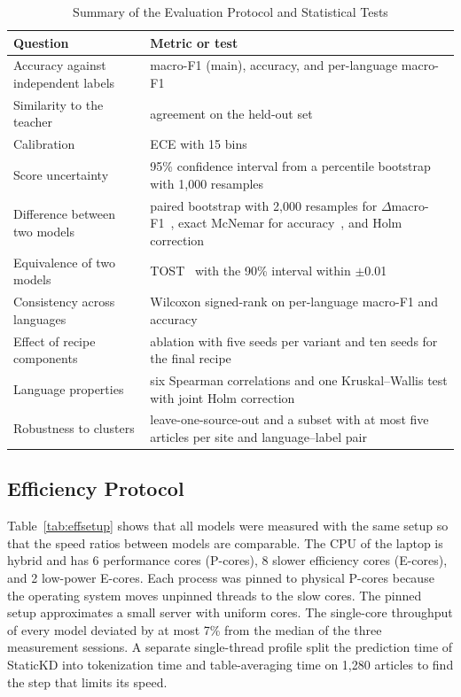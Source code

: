 \documentclass{ieeeaccess}
\begin{document}
\begin{table}[!t]
\caption{Summary of the Evaluation Protocol and Statistical Tests}
\label{tab:protocol}
\centering
\footnotesize
\setlength{\tabcolsep}{3pt}
\begin{tabular}{@{}p{}p{}@{}}
\toprule
Question & Metric or test \\
\midrule
Accuracy against independent labels & macro-F1 (main), accuracy, and per-language macro-F1 \\
Similarity to the teacher & agreement on the held-out set \\
Calibration & ECE with 15 bins \\
Score uncertainty & 95\% confidence interval from a percentile bootstrap with 1,000 resamples \\
Difference between two models & paired bootstrap with 2,000 resamples for $\Delta$macro-F1~\cite{koehn2004significance}, exact McNemar for accuracy~\cite{mcnemar1947}, and Holm correction~\cite{holm1979} \\
Equivalence of two models & TOST~\cite{schuirmann1987tost} with the 90\% interval within $\pm$0.01 \\
Consistency across languages & Wilcoxon signed-rank on per-language macro-F1 and accuracy~\cite{dror2018hitchhiker} \\
Effect of recipe components & ablation with five seeds per variant and ten seeds for the final recipe \\
Language properties & six Spearman correlations and one Kruskal--Wallis test with joint Holm correction \\
Robustness to clusters & leave-one-source-out and a subset with at most five articles per site and language--label pair \\
\bottomrule
\end{tabular}
\end{table}

\subsection{Efficiency Protocol}
\label{sec:effprotocol}
Table~\ref{tab:effsetup} shows that all models were measured with the same setup so that the speed ratios between models are comparable. The CPU of the laptop is hybrid and has 6 performance cores (P-cores), 8 slower efficiency cores (E-cores), and 2 low-power E-cores. Each process was pinned to physical P-cores because the operating system moves unpinned threads to the slow cores. The pinned setup approximates a small server with uniform cores. The single-core throughput of every model deviated by at most 7\% from the median of the three measurement sessions. A separate single-thread profile split the prediction time of StaticKD into tokenization time and table-averaging time on 1,280 articles to find the step that limits its speed.
\end{document}
